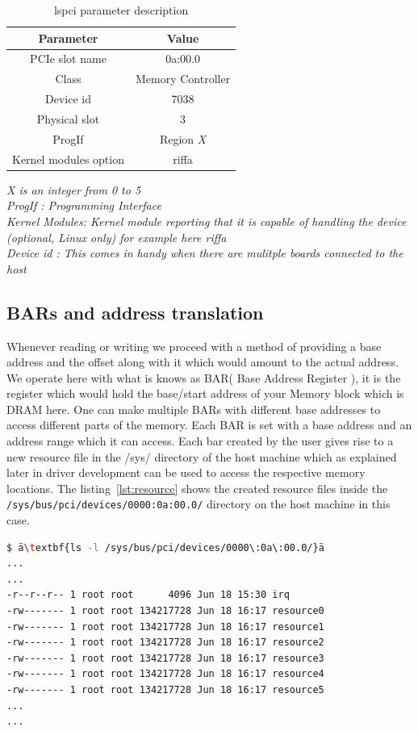 \begin{table}[H]
\centering
\begin{tabular}{c | c}
\hline
Parameter & Value\\
\hline
PCIe slot name & 0a:00.0 \\
Class & Memory Controller\\
Device id & 7038 \\
Physical slot & 3 \\
ProgIf & Region \textit{X} \\
Kernel modules option & riffa
\end{tabular}
\caption{lspci parameter description}
\label{lspci parameters}
\end{table}

\normalsize
\doublespacing
\begin{flushleft}
\textit{X is an integer from 0 to 5\\}
\textit{ProgIf : Programming Interface\\}
\textit{Kernel Modules: Kernel module reporting that it is capable of handling the device (optional, Linux only) for example here riffa\\}
\textit{Device id : This comes in handy when there are mulitple boards connected to the host}
\end{flushleft}

\subsection{BARs and address translation}

Whenever reading or writing we proceed with a method of providing a base address and the offset along with it which would amount to the
actual address.  We operate here with what is knows as BAR( Base Address Register ), it is the register which would hold the base/start
address of your Memory block which is DRAM here. One can make multiple BARs with different base addresses to access different parts of the
memory. Each BAR is set with a base address and an address range which it can access. Each bar created by the user gives rise to a new
resource file in the /sys/ directory of the host machine which as explained later in driver development can be used to access the respective
memory locations. The listing~\ref{lst:resource} shows the created resource files inside the \verb|/sys/bus/pci/devices/0000:0a:00.0/|
directory on the host machine in this case.

\singlespacing
\scriptsize{
\begin{lstlisting}[language=bash, caption=Resource files, label={lst:resource}, emph={root, irq, resource0, resource1, resource2, resource3, resource4, resource5}]
$ ä\textbf{ls -l /sys/bus/pci/devices/0000\:0a\:00.0/}ä
...
...
-r--r--r-- 1 root root      4096 Jun 18 15:30 irq
-rw------- 1 root root 134217728 Jun 18 16:17 resource0
-rw------- 1 root root 134217728 Jun 18 16:17 resource1
-rw------- 1 root root 134217728 Jun 18 16:17 resource2
-rw------- 1 root root 134217728 Jun 18 16:17 resource3
-rw------- 1 root root 134217728 Jun 18 16:17 resource4
-rw------- 1 root root 134217728 Jun 18 16:17 resource5
...
...
\end{lstlisting}
}
\normalsize
\doublespacing


